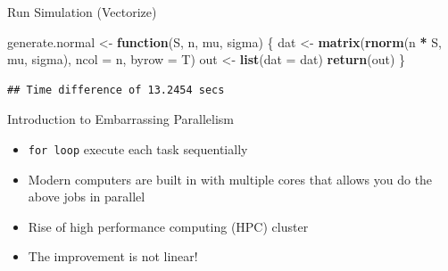 \documentclass[
  ignorenonframetext,
]{beamer}
\newenvironment{Shaded}{\begin{snugshade}}{\end{snugshade}}
\newcommand{\AttributeTok}[1]{\textcolor[rgb]{0.13,0.29,0.53}{#1}}
\newcommand{\ControlFlowTok}[1]{\textcolor[rgb]{0.13,0.29,0.53}{\textbf{#1}}}
\newcommand{\DecValTok}[1]{\textcolor[rgb]{0.00,0.00,0.81}{#1}}
\newcommand{\FunctionTok}[1]{\textcolor[rgb]{0.13,0.29,0.53}{\textbf{#1}}}
\newcommand{\NormalTok}[1]{#1}
\newcommand{\OtherTok}[1]{\textcolor[rgb]{0.56,0.35,0.01}{#1}}
\newcommand{\SpecialCharTok}[1]{\textcolor[rgb]{0.81,0.36,0.00}{\textbf{#1}}}
\begin{document}
\begin{frame}[fragile]{Run Simulation (Vectorize)}
\protect{}\label{run-simulation-vectorize}
\begin{Shaded}
\begin{Highlighting}[]
\NormalTok{generate.normal }\OtherTok{\textless{}{-}} \ControlFlowTok{function}\NormalTok{(S, n, mu, sigma) \{}
\NormalTok{  dat }\OtherTok{\textless{}{-}} \FunctionTok{matrix}\NormalTok{(}\FunctionTok{rnorm}\NormalTok{(n }\SpecialCharTok{*}\NormalTok{ S, mu, sigma), }\AttributeTok{ncol =}\NormalTok{ n, }\AttributeTok{byrow =}\NormalTok{ T)}
\NormalTok{  out }\OtherTok{\textless{}{-}} \FunctionTok{list}\NormalTok{(}\AttributeTok{dat =}\NormalTok{ dat)}
  \FunctionTok{return}\NormalTok{(out)}
\NormalTok{\}}
\end{Highlighting}
\end{Shaded}

\begin{Shaded}
\end{Shaded}

\begin{verbatim}
## Time difference of 13.2454 secs
\end{verbatim}
\end{frame}

\begin{frame}[fragile]{Introduction to Embarrassing Parallelism}
\protect{}\label{introduction-to-embarrassing-parallelism}
\begin{itemize}
\item
  \texttt{for\ loop} execute each task sequentially
\item
  Modern computers are built in with multiple cores that allows you do
  the above jobs in parallel
\item
  Rise of high performance computing (HPC) cluster
\item
  The improvement is not linear!
\end{itemize}
\end{frame}
\end{document}

